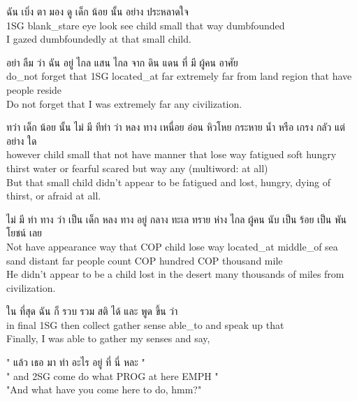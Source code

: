 \documentclass{book}
\begin{document}
	\begin{exe}
		\ex 
		\gll ฉัน เบิ่ง ตา มอง ดู เด็ก น้อย นั้น อย่าง ประหลาดใจ\\
		\textsc{1SG} blank_stare eye look see child small that way dumbfounded\\
		I gazed dumbfoundedly at that small child.
	\end{exe}

	\begin{exe}
		\ex 
		\gll อย่า ลืม ว่า ฉัน อยู่ ไกล แสน ไกล จาก ดิน แดน ที่ มี ผู้คน อาศัย\\
		do_not forget that \textsc{1SG} located_at far extremely far from land region that have people reside\\
		Do not forget that I was extremely far any civilization.
	\end{exe}

	\begin{exe}
		\ex 
		\gll ทว่า เด็ก น้อย นั้น ไม่ มี ทีท่า ว่า หลง ทาง เหนื่อย อ่อน หิวโหย กระหาย น้ำ หรือ เกรง กลัว แต่ อย่าง ใด\\
		however child small that not have manner that lose way fatigued soft hungry thirst water or fearful scared but way any (multiword: at all)\\
		But that small child didn't appear to be fatigued and lost, hungry, dying of thirst, or afraid at all.
	\end{exe}

	\begin{exe}
		\ex 
		\gll ไม่ มี ท่า ทาง ว่า เป็น เด็ก หลง ทาง อยู่ กลาง ทะเล ทราย ห่าง ไกล ผู้คน นับ เป็น ร้อย เป็น พัน โยชน์ เลย\\
		Not have appearance way that \textsc{COP} child lose way located_at middle_of sea sand distant far people count \textsc{COP} hundred \textsc{COP} thousand mile\\
		He didn't appear to be a child lost in the desert many thousands of miles from civilization.
	\end{exe}

	\begin{exe}
		\ex 
		\gll ใน ที่สุด ฉัน ก็ รวบ รวม สติ ได้ และ พูด ขึ้น ว่า\\
		in final \textsc{1SG} then collect gather sense able\_to and speak up that\\
		Finally, I was able to gather my senses and say,
	\end{exe}

	\begin{exe}
		\ex 
		\gll " แล้ว เธอ มา ทำ อะไร อยู่ ที่ นี่ หละ "\\
		" and \textsc{2SG} come do what \textsc{PROG} at here \textsc{EMPH} "\\
		"And what have you come here to do, hmm?"
	\end{exe}
\end{document}

